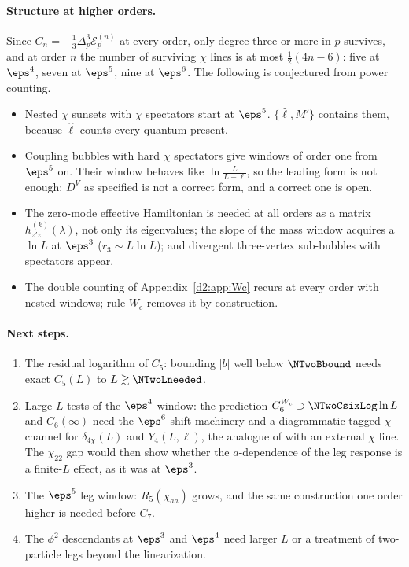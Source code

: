 \paragraph{Structure at higher orders.} Since $C_n=-\frac13\Delta_p^3\mathcal E_p^{(n)}$ at every order, only degree three or
more in $p$ survives, and at order $n$ the number of surviving $\chi$ lines is at most $\frac12(4n-6)$: five at $\eps^4$, seven at
$\eps^5$, nine at $\eps^6$. The following is conjectured from power counting.
\begin{itemize}
\item Nested $\chi$ sunsets with $\chi$ spectators start at $\eps^5$. $\{\hat\ell,M'\}$ contains them, because $\hat\ell$ counts
 every quantum present.
\item Coupling bubbles with hard $\chi$ spectators give windows of order one from $\eps^5$ on. Their window behaves like
 $\ln\frac L{L-\ell}$, so the leading form is not enough; $D^V$ as specified is not a correct form, and a correct one is open.
\item The zero-mode effective Hamiltonian is needed at all orders as a matrix $h^{(k)}_{z'z}(\lambda)$, not only its
 eigenvalues; the slope of the mass window acquires a $\ln L$ at $\eps^3$ ($r_3\sim L\ln L$); and divergent three-vertex
 sub-bubbles with spectators appear.
\item The double counting of Appendix~\ref{d2:app:Wc} recurs at every order with nested windows; rule $W_c$ removes it by
 construction.
\end{itemize}

\paragraph{Next steps.}
\begin{enumerate}
\item The residual logarithm of $C_5$: bounding $|b|$ well below $\NTwoBbound$ needs exact $C_5(L)$ to $L\gtrsim\NTwoLneeded$.
\item Large-$L$ tests of the $\eps^4$ window: the prediction $C_6^{W_c}\supset\NTwoCsixLog\ln L$ and $C_6(\infty)$ need the
 $\eps^6$ shift machinery and a diagrammatic tagged $\chi$ channel for $\delta_{4\chi}(L)$ and $Y_4(L,\ell)$, the analogue of
  with an external $\chi$ line. The $\chi_{22}$ gap would then show whether the
 $a$-dependence of the leg response is a finite-$L$ effect, as it was at $\eps^3$.
\item The $\eps^5$ leg window: $R_5(\chi_{aa})$ grows, and the same construction one order higher is needed before $C_7$.
\item The $\phi^2$ descendants at $\eps^3$ and $\eps^4$ need larger $L$ or a treatment of two-particle legs beyond the
 linearization.
\end{enumerate}

